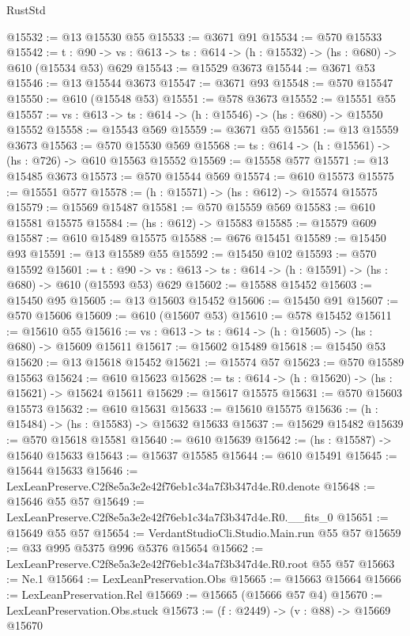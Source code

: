 \begin{lexlean}{RustStd}
\begin{coremodule}
@15532 := @13 @15530 @55
@15533 := @3671 @91
@15534 := @570 @15533
@15542 := {t : @90} ->
  {vs : @613} -> {ts : @614} -> (h : @15532) -> (hs : @680) -> @610 (@15534 @53) @629
@15543 := @15529 @3673
@15544 := @3671 @53
@15546 := @13 @15544 @3673
@15547 := @3671 @93
@15548 := @570 @15547
@15550 := @610 (@15548 @53)
@15551 := @578 @3673
@15552 := @15551 @55
@15557 := {vs : @613} -> {ts : @614} -> (h : @15546) -> (hs : @680) -> @15550 @15552
@15558 := @15543 @569
@15559 := @3671 @55
@15561 := @13 @15559 @3673
@15563 := @570 @15530 @569
@15568 := {ts : @614} -> (h : @15561) -> (hs : @726) -> @610 @15563 @15552
@15569 := @15558 @577
@15571 := @13 @15485 @3673
@15573 := @570 @15544 @569
@15574 := @610 @15573
@15575 := @15551 @577
@15578 := (h : @15571) -> (hs : @612) -> @15574 @15575
@15579 := @15569 @15487
@15581 := @570 @15559 @569
@15583 := @610 @15581 @15575
@15584 := (hs : @612) -> @15583
@15585 := @15579 @609
@15587 := @610 @15489 @15575
@15588 := @676 @15451
@15589 := @15450 @93
@15591 := @13 @15589 @55
@15592 := @15450 @102
@15593 := @570 @15592
@15601 := {t : @90} ->
  {vs : @613} -> {ts : @614} -> (h : @15591) -> (hs : @680) -> @610 (@15593 @53) @629
@15602 := @15588 @15452
@15603 := @15450 @95
@15605 := @13 @15603 @15452
@15606 := @15450 @91
@15607 := @570 @15606
@15609 := @610 (@15607 @53)
@15610 := @578 @15452
@15611 := @15610 @55
@15616 := {vs : @613} -> {ts : @614} -> (h : @15605) -> (hs : @680) -> @15609 @15611
@15617 := @15602 @15489
@15618 := @15450 @53
@15620 := @13 @15618 @15452
@15621 := @15574 @57
@15623 := @570 @15589 @15563
@15624 := @610 @15623
@15628 := {ts : @614} -> (h : @15620) -> (hs : @15621) -> @15624 @15611
@15629 := @15617 @15575
@15631 := @570 @15603 @15573
@15632 := @610 @15631
@15633 := @15610 @15575
@15636 := (h : @15484) -> (hs : @15583) -> @15632 @15633
@15637 := @15629 @15482
@15639 := @570 @15618 @15581
@15640 := @610 @15639
@15642 := (hs : @15587) -> @15640 @15633
@15643 := @15637 @15585
@15644 := @610 @15491
@15645 := @15644 @15633
@15646 := LexLeanPreserve.C2f8e5a3e2e42f76eb1c34a7f3b347d4e.R0.denote
@15648 := @15646 @55 @57
@15649 := LexLeanPreserve.C2f8e5a3e2e42f76eb1c34a7f3b347d4e.R0.__fits_0
@15651 := @15649 @55 @57
@15654 := VerdantStudioCli.Studio.Main.run @55 @57
@15659 := @33 @995 @5375 @996 @5376 @15654
@15662 := LexLeanPreserve.C2f8e5a3e2e42f76eb1c34a7f3b347d4e.R0.root @55 @57
@15663 := Ne.{1}
@15664 := LexLeanPreservation.Obs
@15665 := @15663 @15664
@15666 := LexLeanPreservation.Rel
@15669 := @15665 (@15666 @57 @4)
@15670 := LexLeanPreservation.Obs.stuck
@15673 := (f : @2449) -> (v : @88) -> @15669 @15670

\end{coremodule}
\end{lexlean}
